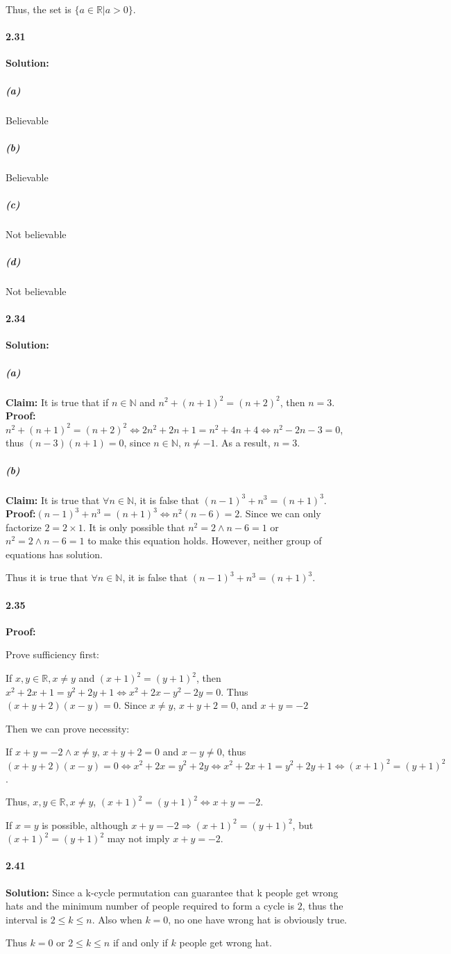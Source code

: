 \documentclass[11pt]{article}
\begin{document}
    Thus, the set is $\{a \in \mathbb{R}| a > 0\}$.
\paragraph{2.31}\textbf{Solution:}
    \subparagraph{(a)}Believable
    \subparagraph{(b)}Believable
    \subparagraph{(c)}Not believable
    \subparagraph{(d)}Not believable

\paragraph{2.34}\textbf{Solution:}
    \subparagraph{(a)}\textbf{Claim:} It is true that if $n \in \mathbb{N}$ and $n^2 + (n+1)^2 = (n+2)^2$, then $n = 3$.\\
    
\textbf{Proof:} $n^2 + (n+1)^2 = (n+2)^2 \Leftrightarrow 2n^2 + 2n + 1 = n^2 + 4n + 4 \Leftrightarrow n^2 - 2n - 3 = 0$, thus $(n-3)(n+1) = 0$, since $n \in \mathbb{N}$, $n \neq -1$. As a result, $n = 3$.
    \subparagraph{(b)}\textbf{Claim:} It is true that $\forall n \in \mathbb{N}$, it is false that $(n-1)^3 + n^3 = (n+1)^3$.\\
    
    \textbf{Proof:}$(n-1)^3 + n^3 = (n+1)^3 \Leftrightarrow n^2(n-6) = 2$. Since we can only factorize $2 = 2 \times 1$. It is only possible that $n^2 = 2 \wedge n-6 = 1$ or $n^2 = 2 \wedge n-6 = 1$ to make this equation holds. However, neither group of equations has solution. 
    
    Thus it is true that $\forall n \in \mathbb{N}$, it is false that $(n-1)^3 + n^3 = (n+1)^3$.
\paragraph{2.35}\textbf{Proof:} 

Prove sufficiency first:

If $x, y \in \mathbb{R}, x \neq y$ and $(x+1)^2 = (y+1)^2$, then $x^2 + 2x + 1 = y^2 + 2y + 1 \Leftrightarrow x^2 + 2x - y^2 - 2y = 0$. Thus $(x+y+2)(x-y)=0$. Since $x \neq y$, $x+y+2 = 0$, and $x + y = -2$

Then we can prove necessity:

If $x + y = -2 \wedge x \neq y$, $x + y + 2 = 0$ and $x - y \neq 0$, thus $(x+y+2)(x-y)=0 \Leftrightarrow x^2+2x = y^2 + 2y \Leftrightarrow x^2 + 2x + 1 = y^2 + 2y + 1 \Leftrightarrow (x + 1)^2 = (y + 1)^2$.

Thus, $x, y \in \mathbb{R}, x \neq y$, $(x+1)^2 = (y+1)^2 \Leftrightarrow x + y = -2$.

If $x = y$ is possible, although $x + y = -2 \Rightarrow (x+1)^2 = (y+1)^2$, but $(x+1)^2 = (y+1)^2$ may not imply $x + y = -2$. 

\paragraph{2.41}\textbf{Solution: }Since a k-cycle permutation can guarantee that k people get wrong hats and the minimum number of people required to form a cycle is $2$, thus the interval is $2 \leq k \leq n$. Also when $k = 0$, no one have wrong hat is obviously true.

Thus $k = 0$ or $2 \leq k \leq n$ if and only if $k$ people get wrong hat.
\end{document}

